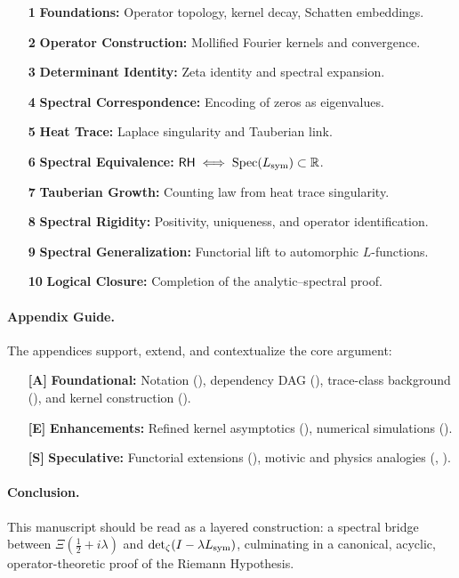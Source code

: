 \begin{itemize}
  \item[\textbf{1}] \textbf{Foundations:} Operator topology, kernel decay, Schatten embeddings.
  \item[\textbf{2}] \textbf{Operator Construction:} Mollified Fourier kernels and convergence.
  \item[\textbf{3}] \textbf{Determinant Identity:} Zeta identity and spectral expansion.
  \item[\textbf{4}] \textbf{Spectral Correspondence:} Encoding of zeros as eigenvalues.
  \item[\textbf{5}] \textbf{Heat Trace:} Laplace singularity and Tauberian link.
  \item[\textbf{6}] \textbf{Spectral Equivalence:} \( \mathsf{RH} \iff \operatorname{Spec}(L_{\mathrm{sym}}) \subset \mathbb{R} \).
  \item[\textbf{7}] \textbf{Tauberian Growth:} Counting law from heat trace singularity.
  \item[\textbf{8}] \textbf{Spectral Rigidity:} Positivity, uniqueness, and operator identification.
  \item[\textbf{9}] \textbf{Spectral Generalization:} Functorial lift to automorphic \( L \)-functions.
  \item[\textbf{10}] \textbf{Logical Closure:} Completion of the analytic–spectral proof.
\end{itemize}

\paragraph*{Appendix Guide.}
The appendices support, extend, and contextualize the core argument:

\begin{itemize}
  \item[\textbf{[A]}] \textbf{Foundational:} Notation (), dependency DAG (), trace-class background (), and kernel construction ().
  \item[\textbf{[E]}] \textbf{Enhancements:} Refined kernel asymptotics (), numerical simulations ().
  \item[\textbf{[S]}] \textbf{Speculative:} Functorial extensions (), motivic and physics analogies (, ).
\end{itemize}

\paragraph*{Conclusion.}
This manuscript should be read as a layered construction: a spectral bridge between \( \Xi(\tfrac{1}{2} + i\lambda) \) and \( \det\nolimits_{\zeta}(I - \lambda L_{\mathrm{sym}}) \), culminating in a canonical, acyclic, operator-theoretic proof of the Riemann Hypothesis.
